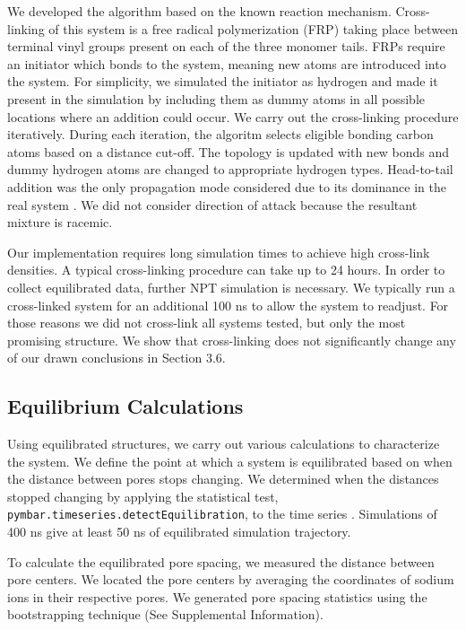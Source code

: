 \documentclass{article}
\begin{document}
  We developed the algorithm based on the known reaction mechanism.
  Cross-linking of this system is a free radical polymerization (FRP) taking
  place between terminal vinyl groups present on each of the three monomer tails.
  FRPs require an initiator which bonds to the system, meaning new atoms are
  introduced into the system. For simplicity, we simulated the initiator as
  hydrogen and made it present in the simulation by including them as dummy atoms
  in all possible locations where an addition could occur. We carry out the
  cross-linking procedure iteratively. During each iteration, the algoritm
  selects eligible bonding carbon atoms based on a distance cut-off. The topology
  is updated with new bonds and dummy hydrogen atoms are changed to appropriate
  hydrogen types.  Head-to-tail addition was the only propagation mode considered
  due to its dominance in the real system \cite{young_introduction_2011}. We did
  not consider direction of attack because the resultant mixture is racemic.

  Our implementation requires long simulation times to achieve high cross-link 
  densities. A typical cross-linking procedure can take up to 24 hours. In
  order to collect equilibrated data, further NPT simulation is necessary. We
  typically run a cross-linked system for an additional 100 ns to allow the system
  to readjust. For those reasons we did not cross-link all systems tested, but only
  the most promising structure. We show that cross-linking does not significantly
  change any of our drawn conclusions in Section 3.6.

  \subsection{Equilibrium Calculations}

  Using equilibrated structures, we carry out various calculations to
  characterize the system. We define the point at which a system is equilibrated
  based on when the distance between pores stops changing.  We determined when
  the distances stopped changing by applying the statistical test,
  \texttt{pymbar.timeseries.detectEquilibration}, to the time series
  \cite{chodera_simple_2016,shirts_statistically_2008}. Simulations of 400 ns
  give at least 50 ns of equilibrated simulation trajectory.

  To calculate the equilibrated pore spacing, we measured the distance between
  pore centers. We located the pore centers by averaging the coordinates of sodium
  ions in their respective pores. We generated pore spacing statistics 
  using the bootstrapping technique (See Supplemental Information).
\end{document}
